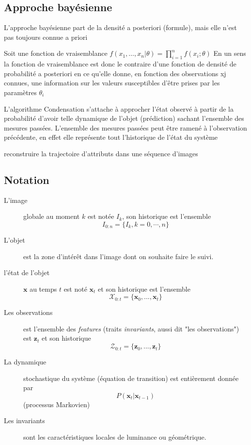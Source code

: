 \documentclass[a4paper,12pt]{report}
\begin{document}
\subsection{Approche bayésienne}
L'approche bayésienne part de la densité a posteriori (formule), mais elle n'est pas toujours connue a priori

Soit une fonction de vraisemblance $f(x_1, \ldots , x_n | \theta) = \prod_{i=1}^{n} f(x_i ; \theta)  $
En un sens la fonction de vraisemblance est donc le contraire d'une fonction de densité de probabilité a posteriori en ce qu'elle donne, en fonction des observations xj connues, une information sur les valeurs susceptibles d'être prises par les paramètres $\theta_i$

L'algorithme Condensation s'attache à approcher l'état observé à partir de la probabilité d'avoir telle dynamique de l'objet (prédiction) sachant l'ensemble des mesures passées. L'ensemble des mesures passées peut être ramené à l'observation précédente, en effet elle représente tout l'historique de l'état du système 

  
reconstruire la trajectoire d'attributs dans une séquence d'images \\
\subsection{Notation}
\begin{description}
\item[L'image] globale au moment $k$ est notée $I_k$, son historique est l'ensemble $$I_{0:n}=\{I_k, k=0,\cdots,n\}$$
\item[L'objet] est la zone d'intérêt dans l'image dont on souhaite faire le suivi.
\item[l'état de l'objet] $\mathbf{x}$ au temps $t$ est noté $\mathbf{x}_t$ et son historique est l'ensemble $$\mathcal{X}_{0:t} = \{\mathbf{x}_0,...,\mathbf{x}_t\}$$
\item[Les observations] est l'ensemble des \textit{features} (traits \textit{invariants}, aussi dit "les observations") est $\mathbf{z}_t$ et son historique $$ \mathcal{Z}_{0:t}=\{\mathbf{z}_0,...,\mathbf{z}_t\}$$
\item[La dynamique] stochastique du système (équation de transition) est entièrement donnée par $$P(\mathbf{x}_t|\mathbf{x}_{t-1})$$ (processus Markovien)
\item[Les invariants] sont les caractéristiques locales de luminance ou géométrique.
\end{description}
\end{document}
